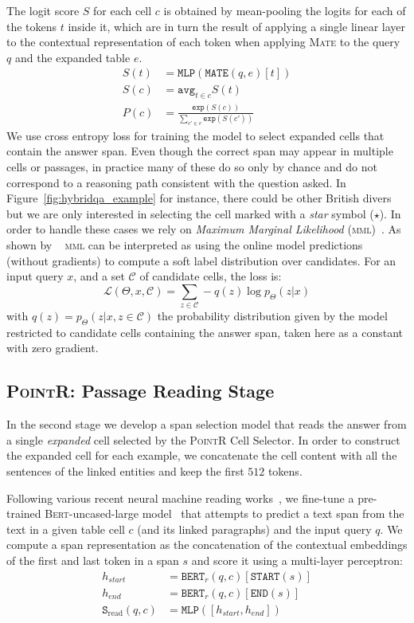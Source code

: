 \documentclass[11pt]{article}
\newcommand{\abr}[1]{\textsc{#1}}
\newcommand{\pointr}{\textsc{PointR}\xspace}
\newcommand{\bert}{\textsc{Bert}\xspace}
\newcommand{\model}{\textsc{Mate}\xspace}
\begin{document}
The logit score $S$ for each cell $c$ is obtained by mean-pooling the logits for each of the tokens $t$ inside it, which are in turn the result of applying a single linear layer to the contextual representation of each token when applying \model to the query $q$ and the expanded table $e$.
\begin{align*}
S(t)&=\texttt{MLP}(\texttt{MATE}(q, e)[t]) \\
S(c)&=\texttt{avg}_{t\in c} S(t) \\
P(c)&=\frac{\texttt{exp}(S(c))}
          {\sum_{c'\in e} \texttt{exp}(S(c'))}
\end{align*}
We use cross entropy loss for training the model to select expanded cells that contain the answer span.
Even though the correct span may appear in multiple cells or passages, in practice many of these do so only by chance and do not correspond to a reasoning path consistent with the question asked. 
In Figure~\ref{fig:hybridqa_example} for instance, there could be other British divers but we are only interested in selecting the cell marked with a \emph{star} symbol ($\star$).
In order to handle these cases we rely on \emph{Maximum Marginal Likelihood} (\abr{mml})~\cite{liang-etal-2013-learning, berant-etal-2013-semantic}. As shown by ~\citet{guu-etal-2017-language} \abr{mml} can be interpreted as using the online model predictions (without gradients) to compute a soft label distribution over candidates. 
For an input query $x$, and a set $\mathcal C$ of candidate cells, the loss is:
\[
\mathcal L(\Theta, x, \mathcal{C}) = \sum_{z\in\mathcal C} - q(z) \log p_\Theta(z|x)
\]
with $q(z) = p_\Theta(z|x, z\in\mathcal{C})$ the probability distribution given by the model restricted to candidate cells containing the answer span, taken here as a constant with zero gradient. \subsection{\pointr: Passage Reading Stage}
In the second stage we develop a span selection model that reads the answer from a single \emph{expanded} cell selected by the \pointr Cell Selector.
In order to construct the expanded cell for each example, we concatenate the cell content with all the sentences of the linked entities
and keep the first $512$ tokens.


Following various recent neural machine reading works~\cite{chen-etal-2017-reading, lee-19, herzig-etal-2021-open}, we fine-tune a pre-trained \bert-uncased-large model~\cite{devlin-19} that attempts to predict a text span from the text in a given table cell $c$ (and its linked paragraphs) and the input query $q$. 
We compute a span representation as the concatenation of the contextual embeddings of the first and
last token in a span $s$ and score it using a multi-layer perceptron:
\begin{align*}
    h_{start} &= \texttt{BERT}_r(q, c)[\texttt{START}(s)] \\
    h_{end} &= \texttt{BERT}_r(q, c)[\texttt{END}(s)] \\
    \texttt{S}_\text{read}(q, c) &= \texttt{MLP}([h_{start}, h_{end}])
\end{align*}
\end{document}
